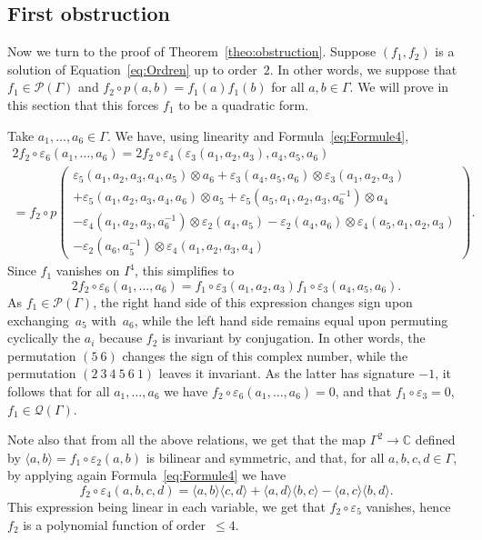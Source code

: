\documentclass[JEP,XML,SOM,Unicode,NoEqCountersInSection]{cedram}
\let\mathcal\mathscr
\theoremstyle{definition}
\newcommand{\CC}{\mathbb{C}}
\begin{document}
\subsection{First obstruction}
Now we turn to the proof of Theorem~\ref{theo:obstruction}. Suppose
$(f_1,f_2)$ is a solution of Equation~\eqref{eq:Ordren} up to order~$2$.
In other words, we suppose that $f_1\in\mathcal{P}(\Gamma)$ and
$f_2\circ p(a,b)=f_1(a)f_1(b)$ for all $a,b\in\Gamma$. We will prove in
this section that this forces $f_1$ to be a quadratic form.

Take $a_1,\ldots,a_6\in\Gamma$. We have, using linearity and
Formula~\eqref{eq:Formule4},
\begin{multline*}
2f_2\circ\varepsilon_6(a_1, \ldots,a_6) =
2f_2\circ\varepsilon_4(\varepsilon_3(a_1,a_2,a_3), a_4,a_5,a_6) \\
= f_2\circ p\left(\begin{array}{c}
\varepsilon_5(a_1,a_2,a_3,a_4,a_5)\otimes a_6+\varepsilon_3(a_4,a_5,a_6)
\otimes\varepsilon_3(a_1,a_2,a_3) \\
+\varepsilon_5(a_1,a_2,a_3,a_4,a_6)\otimes a_5+
\varepsilon_5(a_5,a_1,a_2,a_3,a_6^{-1})\otimes a_4 \\
-\varepsilon_4(a_1,a_2,a_3,a_6^{-1})\otimes\varepsilon_2(a_4,a_5)
-\varepsilon_2(a_4,a_6)\otimes\varepsilon_4(a_5,a_1,a_2,a_3) \\
-\varepsilon_2(a_6,a_5^{-1})\otimes\varepsilon_4(a_1,a_2,a_3,a_4)
\end{array}\right).
\end{multline*}
Since $f_1$ vanishes on $I^4$, this simplifies to
\[ 2f_2\circ\varepsilon_6(a_1,\ldots,a_6)=f_1\circ\varepsilon_3(a_1,a_2,a_3)
f_1\circ\varepsilon_3(a_4,a_5,a_6). \]
As $f_1\in \mathcal{P}(\Gamma)$, the right hand side of this expression
changes sign upon exchanging~$a_5$ with~$a_6$, while the left hand side
remains equal upon permuting cyclically the $a_i$ because $f_2$ is invariant
by conjugation. In other words, the permutation $(5~6)$ changes the sign of
this complex number, while the permutation $(2~3~4~5~6~1)$ leaves it
invariant. As the latter has signature $-1$, it follows that for all
$a_1,\ldots,a_6$ we have $f_2\circ\varepsilon_6(a_1,\ldots, a_6)=0$,
and that $f_1\circ\varepsilon_3=0$, \ie $f_1\in\mathcal{Q}(\Gamma)$.

Note also that from all the above relations, we get that the map
$\Gamma^2\to\CC$ defined by $\langle a,b\rangle= f_1\circ\varepsilon_2(a,b)$
is bilinear and symmetric, and that, for all $a,b,c,d\in\Gamma$, by applying
again Formula~\eqref{eq:Formule4} we have
\begin{equation}
\label{eq:carre} f_2\circ\varepsilon_4(a,b,c,d)=
\langle a,b\rangle \langle c,d\rangle+\langle a,d\rangle\langle b,c\rangle
-\langle a,c\rangle\langle b,d\rangle.
\end{equation}
This expression being linear in each variable, we get that
$f_2\circ\varepsilon_5$ vanishes, hence $f_2$ is a polynomial function of
order~$\leq 4$.
\end{document}
